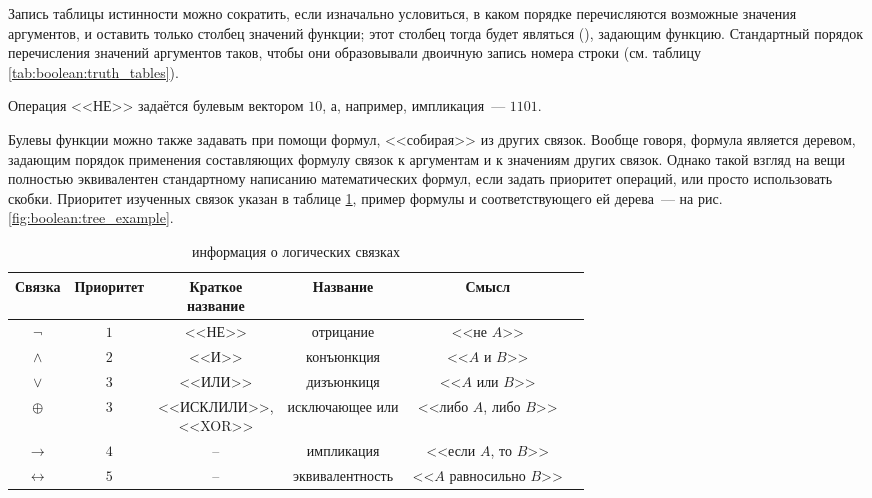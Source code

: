 
Запись таблицы истинности можно сократить, если изначально условиться, в каком порядке перечисляются возможные значения аргументов, и оставить только столбец значений функции;
этот столбец тогда будет являться  (), задающим функцию.
Стандартный порядок перечисления значений аргументов таков, чтобы они образовывали двоичную запись номера строки (см. таблицу \ref{tab:boolean:truth_tables}).

\begin{example}
    Операция <<НЕ>> задаётся булевым вектором $ 10 $, а, например, импликация~--- $ 1101 $.
\end{example}

Булевы функции можно также задавать при помощи формул, <<собирая>> из других связок.
Вообще говоря, формула является деревом, задающим порядок применения составляющих формулу связок к аргументам и к значениям других связок.
Однако такой взгляд на вещи полностью эквивалентен стандартному написанию математических формул, если задать приоритет операций, или просто использовать скобки.
Приоритет изученных связок указан в таблице \ref{tab:boolean:full_info}, пример формулы и соответствующего ей дерева~--- на рис. \ref{fig:boolean:tree_example}.

\begin{table}[ht!]
    \center
    \begin{tabular}{|c|c|c|c|c|c|}
        \hline
        Связка               & Приоритет & \makecell{Краткое \\ название}     & Название        & Смысл                       \\
        \hline
        \hline
        $ \neg $             & $ 1 $     & <<НЕ>>                             & отрицание       & <<не $ A $>>                \\
        $ \wedge $           & $ 2 $     & <<И>>                              & конъюнкция      & <<$ A $ и $ B $>>           \\
        $ \vee $             & $ 3 $     & <<ИЛИ>>                            & дизъюнкиця      & <<$ A $ или $ B $>>         \\
        $ \oplus $           & $ 3 $     & \makecell{<<ИСКЛИЛИ>>, \\ <<XOR>>} & исключающее или & <<либо $ A $, либо $ B $>>  \\
        $ \rightarrow $      & $ 4 $     & --                                 & импликация      & <<если $ A $, то $ B $>>    \\
        $ \leftrightarrow $  & $ 5 $     & --                                 & эквивалентность & <<$ A $ равносильно $ B $>> \\
        \hline
    \end{tabular}
    \caption{информация о логических связках}
    \label{tab:boolean:full_info}
\end{table}


